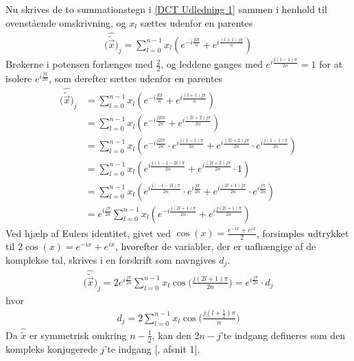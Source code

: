 Nu skrives de to summationstegn i \ref{DCT Udledning 1} sammen i henhold til ovenstående omskrivning, og $x_l$ sættes udenfor en parentes
\begin{align*}
\Big(\hat{\tilde{\vec{x}}}\Big)_j = \sum_{l=0}^{n - 1} x_l(\textit{e}^{-i \frac{jl\pi}{n}} + e^{i\frac{(l+1)j\pi}{n}})
\end{align*}
Brøkerne i potensen forlænges med $\frac{2}{2}$, og leddene ganges med $e^{i\frac{j(1-1)\pi}{2n}}=1$ for at isolere $ e^{i \frac{j\pi}{2n}}$, som derefter sættes udenfor en parentes
\begin{equation*}
\begin{split}
\Big(\hat{\tilde{\vec{x}}}\Big)_j& = \sum_{l=0}^{n - 1} x_l(\textit{e}^{-i \frac{jl\pi}{n}} + e^{i\frac{(l+1)j\pi}{n}}) \\
 & = \sum_{l=0}^{n - 1} x_l(e^{-i \frac{j2l\pi}{2n}} + e^{i\frac{(2l+2)j\pi}{2n}}) \\ 
 & = \sum_{l=0}^{n - 1} x_l(e^{-i \frac{j2l\pi}{2n}} \cdot e^{i\frac{j(1-1)\pi}{2n}} + e^{i\frac{(2l+2)j\pi}{2n}} \cdot e^{i\frac{j(1-1)\pi}{2n}}) \\
 & = \sum_{l=0}^{n - 1} x_l(e^{i \frac{j(1-1-2l)\pi}{2n}} + e^{i\frac{(2l+2)j\pi}{2n}} \cdot 1) \\
 & = \sum_{l=0}^{n - 1} x_l(e^{i \frac{j(-1-2l)\pi}{2n}} \cdot e^{i\frac{j\pi}{2n}} + e^{i\frac{(2l+1)j\pi}{2n}} \cdot e^{i\frac{j\pi}{2n}}) \\
 & = e^{i \frac{j\pi}{2n}} \sum_{l=0}^{n - 1} x_l(e^{-i \frac{j(2l+1)\pi}{2n}} + e^{i \frac{j(2l+1)\pi}{2n}})
\end{split}
\end{equation*}
Ved hjælp af Eulers identitet, givet ved $\cos(x) = \frac{e^{-ix}+e^{ix}}{2}$, forsimples udtrykket til $2 \cos(x) = e^{-ix}+e^{ix}$, hvorefter de variabler, der er uafhængige af de komplekse tal, skrives i en forskrift som navngives $d_j$.
\begin{align}
\Big(\hat{\tilde{\vec{{x}}}}\Big)_j = 2e^{i \frac{j\pi}{2n}} \sum_{l=0}^{n - 1} x_l \cos \bigg( \frac{j(2l+1)\pi}{2n} \bigg) = e^{i\frac{j\pi}{2n}} \cdot d_j
\label{DCT Udledning 2}
\end{align}
hvor
\begin{align}
d_j = 2 \sum_{l=0}^{n - 1} x_l \cos \bigg( \frac{j(l+\frac{1}{2})\pi}{n} \bigg)
\label{DCT Udledning 3}
\end{align}
Da $\hat{\tilde{x}}$ er symmetrisk omkring $n-\frac{1}{2}$, kan den $2n-j$'te indgang defineres som den kompleks konjugerede $j$'te indgang [\citet{konjugeret}, afsnit 1].
\let\conjugatet\overline
